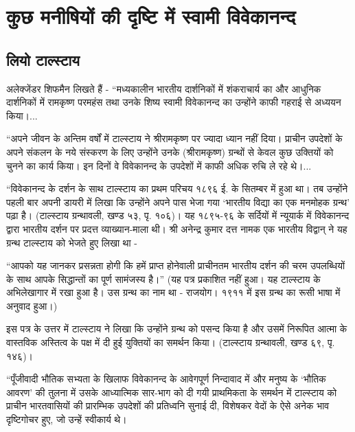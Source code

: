 
\chapter{कुछ मनीषियों की दृष्टि में स्वामी विवेकानन्द }

\indentsecionsintoc


\section*{लियो टाल्स्टाय}


अलेक्जेंडर शिफमैन लिखते हैं - “मध्यकालीन भारतीय दार्शनिकों में शंकराचार्य का और आधुनिक दार्शनिकों में रामकृष्ण परमहंस तथा उनके शिष्य स्वामी विवेकानन्द का उन्होंने काफी गहराई से अध्ययन किया।... 

“अपने जीवन के अन्तिम वर्षों में टाल्स्टाय ने श्रीरामकृष्ण पर ज्यादा ध्यान नहीं दिया। प्राचीन उपदेशों के अपने संकलन के नये संस्करण के लिए उन्होंने उनके (श्रीरामकृष्ण) ग्रन्थों से केवल कुछ उक्तियों को चुनने का कार्य किया। इन दिनों वे विवेकानन्द के उपदेशों में काफी अधिक रुचि ले रहे थे।... 

“विवेकानन्द के दर्शन के साथ टाल्स्टाय का प्रथम परिचय १८९६ ई. के सितम्बर में हुआ था। तब उन्होंने पहली बार अपनी डायरी में लिखा कि उन्होंने अपने पास भेजा गया ‘भारतीय विद्या का एक मनमोहक ग्रन्थ’ पढ़ा है। (टाल्स्टाय ग्रन्थावली, खण्ड ५३, पृ. १०६)। यह १८९५-९६ के सर्दियों में न्यूयार्क में विवेकानन्द द्वारा भारतीय दर्शन पर प्रदत्त व्याख्यान-माला थी। श्री अनेन्द्र कुमार दत्त नामक एक भारतीय विद्वान् ने यह ग्रन्थ टाल्स्टाय को भेजते हुए लिखा था - 

“आपको यह जानकर प्रसन्नता होगी कि हमें प्राप्त होनेवाली प्राचीनतम भारतीय दर्शन की चरम उपलब्धियों के साथ आपके सिद्धान्तों का पूर्ण सामंजस्य है।” (यह पत्र प्रकाशित नहीं हुआ। यह टाल्स्टाय के अभिलेखागार में रखा हुआ है। उस ग्रन्थ का नाम था - राजयोग। १९११ में इस ग्रन्थ का रूसी भाषा में अनुवाद हुआ।) 

इस पत्र के उत्तर में टाल्स्टाय ने लिखा कि उन्होंने ग्रन्थ को पसन्द किया है और उसमें निरूपित आत्मा के वास्तविक अस्तित्व के पक्ष में दी हुई युक्तियों का समर्थन किया। (टाल्स्टाय ग्रन्थावली, खण्ड ६९, पृ. १४६)। 

“पूँजीवादी भौतिक सभ्यता के खिलाफ विवेकानन्द के आवेगपूर्ण निन्दावाद में और मनुष्य के ‘भौतिक आवरण’ की तुलना में उसके आध्यात्मिक सार-भाग को दी गयी प्राथमिकता के समर्थन में टाल्स्टाय को प्राचीन भारतवासियों की प्रारम्भिक उपदेशों की प्रतिध्वनि सुनाई दी, विशेषकर वेदों के ऐसे अनेक भाव दृष्टिगोचर हुए, जो उन्हें स्वीकार्य थे। 

